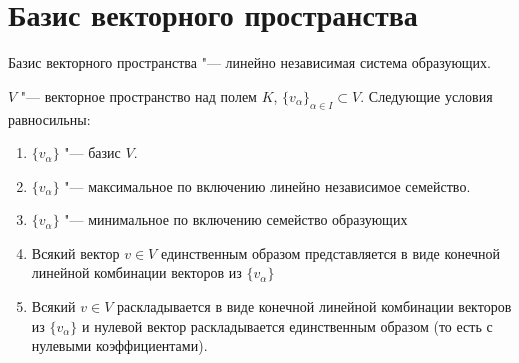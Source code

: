﻿

\section{Базис векторного пространства}

\begin{Def}
	Базис векторного пространства "--- линейно независимая система образующих.
\end{Def}

\begin{theorem}
	$V$ "--- векторное пространство над полем $K$, $\{v_{\alpha}\}_{\alpha \in I} \subset V$.
	Следующие условия равносильны:
	\begin{enumerate}
	\item
		$\{v_{\alpha}\}$ "--- базис $V$.

	\item
		$\{v_{\alpha}\}$ "--- максимальное по включению линейно независимое семейство.

	\item
		$\{v_{\alpha}\}$ "--- минимальное по включению семейство образующих

	\item
		Всякий вектор $v \in V$ единственным образом представляется в виде конечной
		линейной комбинации векторов из $\{v_{\alpha}\}$

	\item
		Всякий $v \in V$ раскладывается в виде конечной линейной комбинации векторов из
		$\{v_{\alpha}\}$ и нулевой вектор раскладывается единственным образом (то есть с нулевыми коэффициентами).
	\end{enumerate}
\end{theorem}
